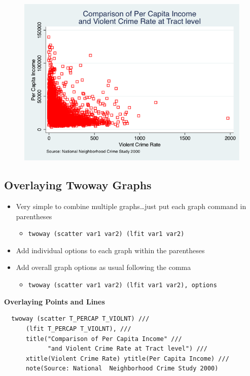 \documentclass[]{book}
\providecommand{\tightlist}{%
  \setlength{\itemsep}{0pt}\setlength{\parskip}{0pt}}
\begin{document}
\begin{figure}
\centering
\includegraphics{Stata/StataModGraph/images/msymbol_mcolor.png}
\caption{}
\end{figure}

\subsection{Overlaying Twoway Graphs}\label{overlaying-twoway-graphs}

\begin{itemize}
\tightlist
\item
  Very simple to combine multiple graphs\ldots{}just put each graph
  command in parentheses

  \begin{itemize}
  \tightlist
  \item
    \texttt{twoway\ (scatter\ var1\ var2)\ (lfit\ var1\ var2)}
  \end{itemize}
\item
  Add individual options to each graph within the parentheses
\item
  Add overall graph options as usual following the comma

  \begin{itemize}
  \tightlist
  \item
    \texttt{twoway\ (scatter\ var1\ var2)\ (lfit\ var1\ var2),\ options}
  \end{itemize}
\end{itemize}

\textbf{Overlaying Points and Lines}

\begin{verbatim}
  twoway (scatter T_PERCAP T_VIOLNT) ///
      (lfit T_PERCAP T_VIOLNT), ///
      title("Comparison of Per Capita Income" ///
            "and Violent Crime Rate at Tract level") ///
      xtitle(Violent Crime Rate) ytitle(Per Capita Income) ///
      note(Source: National  Neighborhood Crime Study 2000)
\end{verbatim}
\end{document}
